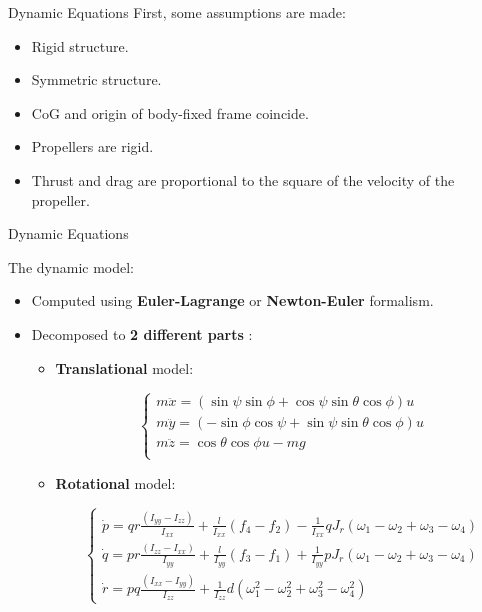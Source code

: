 \documentclass{thesisbeamer}
\begin{document}
\begin{frame}[t]{Dynamic Equations} \vspace{4pt}
First, some assumptions are made:

\begin{itemize}[<+->]
	\item Rigid structure.
	\item Symmetric structure.
	\item CoG and origin of body-fixed frame coincide.
	\item Propellers are rigid.
	\item Thrust and drag are proportional to the square of the velocity of the propeller.
\end{itemize}
\end{frame}


\begin{frame}[t]{Dynamic Equations} \vspace{4pt}

The dynamic model:
\begin{itemize}[<+->]
	\item Computed using \textbf{Euler-Lagrange} or \textbf{Newton-Euler} formalism.
	\item Decomposed to \textbf{2 different parts} \cite{Fantoni2016}:
		\begin{itemize}
			\item \textbf{Translational} model:

\begin{equation}\label{translation_model_N_E}
\begin{cases}
m \ddot{x} = (\sin \psi \sin \phi + \cos \psi \sin \theta \cos \phi)u \\
m \ddot{y} = (- \sin \phi \cos \psi + \sin \psi \sin \theta \cos \phi )u \\
m \ddot{z} = \cos \theta \cos \phi u -mg \\
\end{cases}
\end{equation}			
			
			\item \textbf{Rotational} model:

\begin{equation}
\begin{cases}
\dot{p} = qr \frac{(I_{yy}-I_{zz})}{I_{xx}} + \frac{l}{I_{xx}}(f_4-f_2) - \frac{1}{I_{xx}}qJ_r (\omega_1 - \omega_2 + \omega_3 - \omega_4) \\
\dot{q} = pr \frac{(I_{zz}-I_{xx})}{I_{yy}} + \frac{l}{I_{yy}}(f_3-f_1) + \frac{1}{I_{yy}}pJ_r (\omega_1 - \omega_2 + \omega_3 - \omega_4) \\
\dot{r} = pq \frac{(I_{xx}-I_{yy})}{I_{zz}} + \frac{1}{I_{zz}} d (\omega_1^2 -\omega_2^2 + \omega_3^2 - \omega_4^2)
\end{cases}
\end{equation}			
		\end{itemize}
\end{itemize}
\end{frame}
\end{document}
